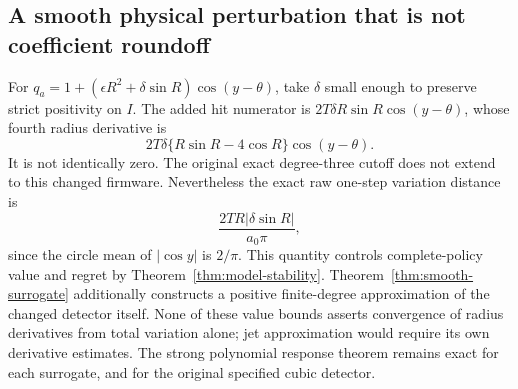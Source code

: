 \subsection{A smooth physical perturbation that is not coefficient roundoff}
For $q_a=1+(\epsilon R^2+\delta\sin R)\cos(y-\theta)$, take $\delta$ small
enough to preserve strict positivity on $I$. The added hit numerator is
$2T\delta R\sin R\cos(y-\theta)$, whose fourth radius derivative is
\[
 2T\delta\{R\sin R-4\cos R\}\cos(y-\theta).
\]
It is not identically zero. The original exact degree-three cutoff does not
extend to this changed firmware. Nevertheless the exact raw one-step
variation distance is
\[
 \frac{2TR|\delta\sin R|}{a_0\pi},
\]
since the circle mean of $|\cos y|$ is $2/\pi$. This quantity controls
complete-policy value and regret by Theorem~\ref{thm:model-stability}.
Theorem~\ref{thm:smooth-surrogate} additionally constructs a positive
finite-degree approximation of the changed detector itself. None of these
value bounds asserts convergence of radius derivatives from total variation
alone; jet approximation would require its own derivative estimates.
The strong polynomial response theorem remains exact for each surrogate,
and for the original specified cubic detector.
